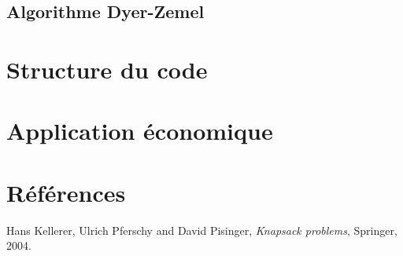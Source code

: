 \documentclass{article}
\begin{document}
\subsection{Algorithme Dyer-Zemel}

\section{Structure du code}

\section{Application économique}

\section{Références}

\begin{thebibliography}{9}
  Hans Kellerer, Ulrich Pferschy and David Pisinger,
  \textit{Knapsack problems},
  Springer,
  2004.
\end{thebibliography}
\end{document}

